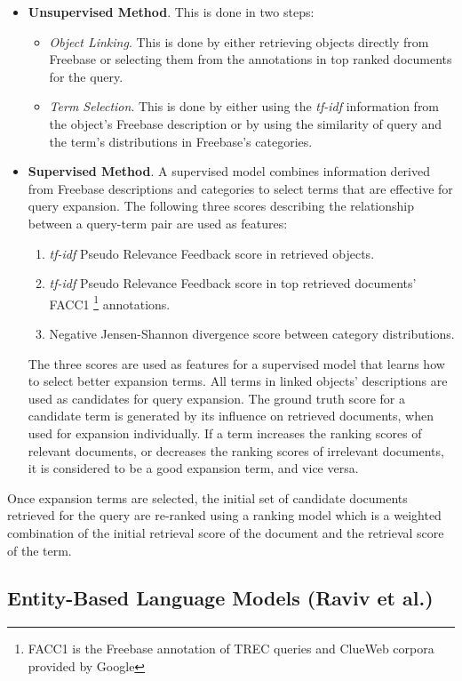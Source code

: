 \documentclass{article}
\begin{document}
\begin{itemize}
    \item \textbf{Unsupervised Method}. This is done in two steps:
    \begin{itemize}
        \item \textit{Object Linking}. This is done by either retrieving objects directly from Freebase or selecting them from the annotations in top ranked documents for the query.
        \item \textit{Term Selection}. This is done by either using the \textit{tf-idf} information from the object's Freebase description or by using the similarity of query and the term’s distributions in Freebase’s categories. 
    \end{itemize}
    \item \textbf{Supervised Method}. A supervised model combines information derived from Freebase descriptions and categories to select terms that are effective for query expansion. The following three scores describing the relationship between a query-term pair are used as features:
    \begin{enumerate}
        \item \textit{tf-idf} Pseudo Relevance Feedback score in retrieved objects.
        \item \textit{tf-idf} Pseudo Relevance Feedback score in top retrieved documents’ FACC1 \footnote{FACC1 is the Freebase annotation of TREC queries and ClueWeb corpora provided by Google} annotations.
        \item Negative Jensen-Shannon divergence score between category distributions.
    \end{enumerate}
    The three scores are used as features for a supervised model that learns how to select better expansion terms. All terms in linked objects’ descriptions are used as candidates for query expansion. The ground truth score for a candidate term is generated by its influence on retrieved documents, when used for expansion individually. If a term increases the ranking scores of relevant documents, or decreases the ranking scores of irrelevant documents, it is considered to be a good expansion term, and vice versa.
\end{itemize}
Once expansion terms are selected, the initial set of candidate documents retrieved for the query are re-ranked using a ranking model which is a weighted combination of the initial retrieval score of the document and the retrieval score of the term. 

\subsection{Entity-Based Language Models (Raviv et al.\cite{raviv2016document})}
\label{subsec:eblm}
\end{document}
